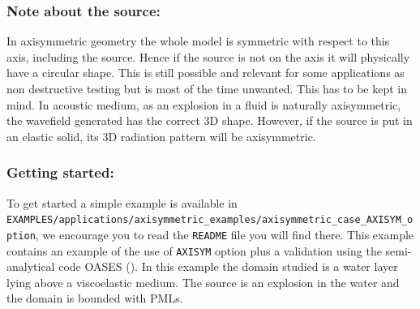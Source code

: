 \subsubsection*{Note about the source:}
In axisymmetric geometry the whole model is symmetric with respect to this axis, including the source. Hence if the source is not on the axis it will physically
have a circular shape. This is still possible and relevant for some applications as non destructive testing but
is most of the time unwanted. This has to be kept in mind. In acoustic medium, as an explosion in a fluid is naturally axisymmetric, the wavefield generated has the
correct 3D shape. However, if the source is put in an elastic solid, its 3D radiation pattern will be axisymmetric.\newline


\subsubsection*{Getting started:}
To get started a simple example is available in\newline
\texttt{EXAMPLES/applications/axisymmetric\_examples/axisymmetric\_case\_AXISYM\_option},
we encourage you to read the \texttt{README} file you will find there.
This example contains an example of the use of \texttt{AXISYM} option plus a validation using the semi-analytical code OASES (\cite{Oases2004}).
In this example the domain studied is a water layer lying above a viscoelastic medium. The source is an explosion in the water and the domain is bounded with PMLs.\newline


